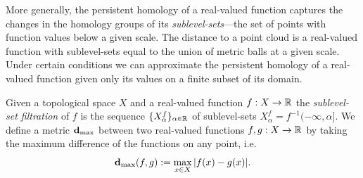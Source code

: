 
More generally, the persistent homology of a real-valued function captures the changes in the homology groups of its \emph{sublevel-sets}---the set of points with function values below a given scale.
The distance to a point cloud is a real-valued function with sublevel-sets equal to the union of metric balls at a given scale.
Under certain conditions we can approximate the persistent homology of a real-valued function given only its values on a finite subset of its domain.

Given a topological space $X$ and a real-valued function $f:X\to\mathbb{R}$ the \emph{sublevel-set filtration} of $f$ is the sequence $\{X^f_\alpha\}_{\alpha\in\mathbb{R}}$ of sublevel-sets $X^f_\alpha = f^{-1}(-\infty, \alpha]$.
We define a metric $\mathbf{d}_{\mathrm{max}}$ between two real-valued functions $f,g:X\to\mathbb{R}$ by taking the maximum difference of the functions on any point, i.e.
\[ \mathbf{d}_{\mathrm{max}}(f, g) := \max_{x\in X} |f(x) - g(x)|. \]

